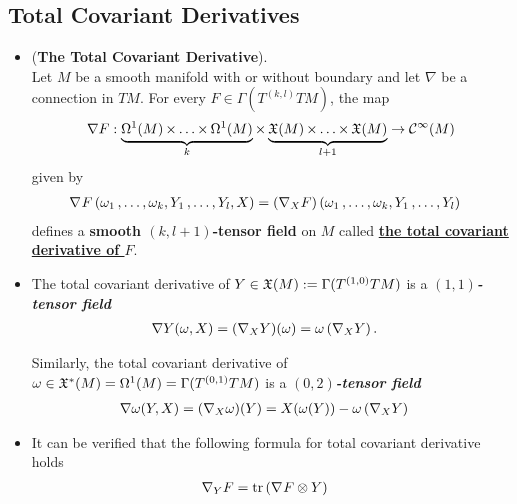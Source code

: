 \documentclass[11pt]{article}
\begin{document}
\subsection{Total Covariant Derivatives}
\begin{itemize}
\item \begin{proposition} (\textbf{The Total Covariant Derivative}). \citep{lee2018introduction}\\
Let $M$ be a smooth manifold with or without boundary and let $\nabla$ be a connection in $TM$. For every $F\in \Gamma(T^{(k,l)}TM)$,  the map
\begin{align*}
\nabla F: \underbrace{\Omega^1(M) \,{\times}\ldots{\times}\, \Omega^1(M)}_{k} \times \underbrace{{\mathfrak X}(M) \,{\times}\ldots{\times}\, {\mathfrak X}(M)}_{l+1} \rightarrow {\mathcal C}^{\infty}(M)
\end{align*} given by
\begin{align}
\nabla_{}{F}\left(\omega_1 \,{,}\ldots{,}\, \omega_k, Y_1 \,{,}\ldots{,}\, Y_l, X\right)&= (\nabla_{X}{F})\left(\omega_1 \,{,}\ldots{,}\, \omega_k, Y_1 \,{,}\ldots{,}\, Y_l\right)\label{eqn: total_covariant_derivatives_tensor}
\end{align} defines a \textbf{smooth $(k,l+1)$-tensor field} on $M$ called \underline{\textbf{the total covariant derivative of $F$}}.
\end{proposition}

\item \begin{remark}
The total covariant derivative of $Y \in {\mathfrak X}(M) := \Gamma(T^{(1,0)}TM)$ is a \emph{\textbf{$(1,1)$-tensor field}}
\begin{align*}
\nabla Y (\omega, X) &= (\nabla_{X}{Y})(\omega) = \omega\left(\nabla_{X}{Y}\right).
\end{align*} %

Similarly, the total covariant derivative of $\omega \in {\mathfrak X}^{*}(M) = \Omega^1(M) = \Gamma(T^{(0,1)}TM)$ is a \emph{\textbf{$(0,2)$-tensor field}}
\begin{align*}
\nabla \omega (Y, X) &= (\nabla_{X}{\omega})(Y) = X(\omega(Y)) -  \omega\left(\nabla_{X}{Y}\right)
\end{align*}
\end{remark}

\item \begin{remark} It can be verified that the following formula for total covariant derivative holds
\begin{align}
\nabla_{Y}{F} &= \text{tr}\left(\nabla_{}{F} \otimes Y\right) \label{eqn: total_covariant_trace}
\end{align}
\end{remark}


\end{itemize}
\end{document}
